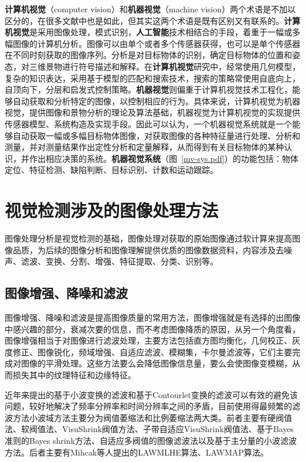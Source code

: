 {\textbf{计算机视觉}（computer vision）和\textbf{机器视觉}（machine vision）两个术语是不加以区分的，在很多文献中也是如此，但其实这两个术语是既有区别又有联系的。\textbf{计算机视觉}是采用图像处理，模式识别，\textbf{人工智能}技术相结合的手段，着重于一幅或多幅图像的计算机分析。图像可以由单个或者多个传感器获得，也可以是单个传感器在不同时刻获取的图像序列。分析是对目标物体的识别，确定目标物体的位置和姿态，对三维景物进行符号描述和解释。在\textbf{计算机视觉}研究中，经常使用几何模型，复杂的知识表达，采用基于模型的匹配和搜索技术，搜索的策略常使用自底向上，自顶向下，分层和启发式控制策略。\textbf{机器视觉}则偏重于计算机视觉技术工程化，能够自动获取和分析特定的图像，以控制相应的行为。具体来说，计算机视觉为机器视觉，提供图像和景物分析的理论及算法基础，机器视觉为计算机视觉的实现提供传感器模型、系统构造及实现手段。因此可以认为，一个机器视觉系统就是一个能够自动获取一幅或多幅目标物体图像，对获取图像的各种特征量进行处理、分析和测量，并对测量结果作出定性分析和定量解释，从而得到有关目标物体的某种认识，并作出相应决策的系统。\textbf{机器视觉系统}（图~\ref{mv-sys.pdf}）的功能包括：物体定位、特征检测、缺陷判断、目标识别、计数和运动跟踪。


\section{ 视觉检测涉及的图像处理方法}
图像处理分析是视觉检测的基础，图像处理对获取的原始图像通过软计算来提高图像品质，为后续的图像分析和图像理解提供优质的图像数据资料，内容涉及去噪声、滤波、变换、分割、增强、特征提取、分类、识别等。
\subsection{图像增强、降噪和滤波}
图像增强、降噪和滤波是提高图像质量的常用方法，图像增强就是有选择的出图像中感兴趣的部分，衰减次要的信息，而不考虑图像降质的原因，从另一个角度看，图像增强相当于对图像进行滤波处理，主要方法包括直方图均衡化，几何校正、灰度修正、图像锐化，频域增强、自适应滤波、模糊集，卡尔曼滤波等，它们主要完成对图像的平滑处理。这些方法要么会降低图像信息量，要么会使图像变模糊，从而损失其中的纹理特征和边缘特征。

近年来提出的基于小波变换的滤波和基于Contourlet变换的滤波可以有效的避免该问题，较好地解决了频率分辨率和时间分辨率之间的矛盾，目前使用得最频繁的滤波方法小波域方法主要分为阀值萎缩法和比例萎缩法两大类。前者主要有硬阀值法、软阀值法、VisuShrink阀值方法、子带自适应VisuShrink阀值法、基于Bayes准则的Bayes shrink方法、自适应多阀值的图像滤波法以及基于主分量的小波滤波方法。后者主要有Mihcak等人提出的LAWMLHE算法、LAWMAP算法。

}
